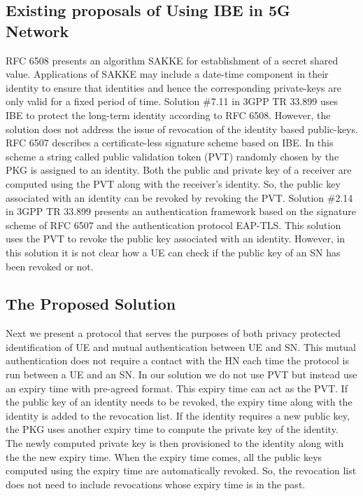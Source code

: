 \documentclass[runningheads,a4paper]{llncs} %
\begin{document}
\subsection{Existing proposals of Using IBE in 5G Network}
RFC 6508 \cite{RFC6508} presents an algorithm SAKKE for establishment of a secret shared value. Applications of SAKKE may include a date-time component in their identity to ensure that identities and hence the corresponding private-keys are only valid for a fixed period of time. Solution \#7.11 in 3GPP TR 33.899 \cite{TR33899} uses IBE to protect the long-term identity according to RFC 6508. However, the solution does not address the issue of revocation of the identity based public-keys. RFC 6507 \cite{RFC6507} describes a certificate-less signature scheme based on IBE. In this scheme a string called public validation token (PVT) randomly chosen by the PKG is assigned to an identity. Both the public and private key of a receiver are computed using the PVT along with the receiver's identity. So, the public key associated with an identity can be revoked by revoking the PVT. Solution \#2.14 in 3GPP TR 33.899 presents an authentication framework based on the signature scheme of RFC 6507 and the authentication protocol EAP-TLS. This solution uses the PVT to revoke the public key associated with an identity. However, in this solution it is not clear how a UE can check if the public key of an SN has been revoked or not.

\subsection{The Proposed Solution}
Next we present a protocol that serves the purposes of both privacy protected identification of UE and mutual authentication between UE and SN. This mutual authentication does not require a contact with the HN each time the protocol is run between a UE and an SN. In our solution we do not use PVT but instead use an expiry time with pre-agreed format. This expiry time can act as the PVT. If the public key of an identity needs to be revoked, the expiry time along with the identity is added to the revocation list. If the identity requires a new public key, the PKG uses another expiry time to compute the private key of the identity. The newly computed private key is then provisioned to the identity along with the the new expiry time. When the expiry time comes, all the public keys computed using the expiry time are automatically revoked. So, the revocation list does not need to include revocations whose expiry time is in the past.
\end{document}
